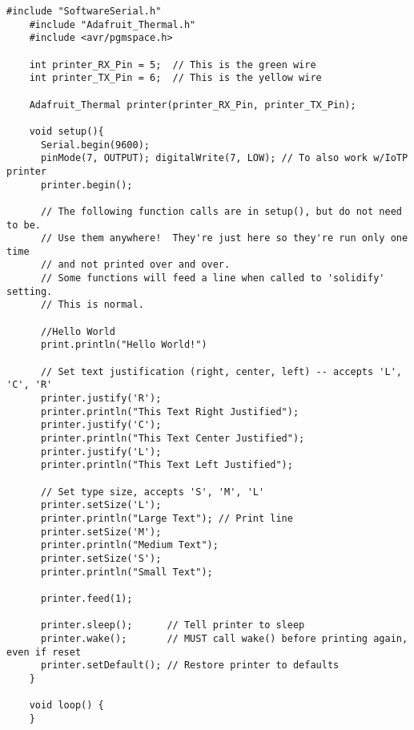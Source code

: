\begin{Verbatim}[gobble=3,fontsize=\small]
    #include "SoftwareSerial.h"
    #include "Adafruit_Thermal.h"
    #include <avr/pgmspace.h>

    int printer_RX_Pin = 5;  // This is the green wire
    int printer_TX_Pin = 6;  // This is the yellow wire

    Adafruit_Thermal printer(printer_RX_Pin, printer_TX_Pin);

    void setup(){
      Serial.begin(9600);
      pinMode(7, OUTPUT); digitalWrite(7, LOW); // To also work w/IoTP printer
      printer.begin();

      // The following function calls are in setup(), but do not need to be.
      // Use them anywhere!  They're just here so they're run only one time
      // and not printed over and over.
      // Some functions will feed a line when called to 'solidify' setting.
      // This is normal.

      //Hello World        
      print.println("Hello World!")

      // Set text justification (right, center, left) -- accepts 'L', 'C', 'R'
      printer.justify('R');
      printer.println("This Text Right Justified");
      printer.justify('C');
      printer.println("This Text Center Justified");
      printer.justify('L');
      printer.println("This Text Left Justified");

      // Set type size, accepts 'S', 'M', 'L'
      printer.setSize('L');
      printer.println("Large Text"); // Print line
      printer.setSize('M');
      printer.println("Medium Text");
      printer.setSize('S');
      printer.println("Small Text");

      printer.feed(1);

      printer.sleep();      // Tell printer to sleep
      printer.wake();       // MUST call wake() before printing again, even if reset
      printer.setDefault(); // Restore printer to defaults
    }

    void loop() {
    }
\end{Verbatim}
